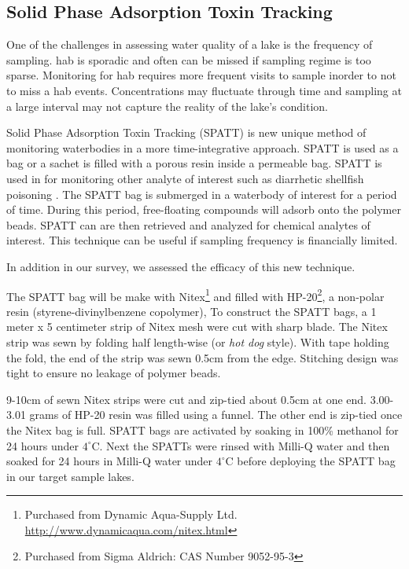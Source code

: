 \clearpage
\newpage

\subsection{Solid Phase Adsorption Toxin Tracking}

One of the challenges in assessing water quality of a lake is the frequency of sampling. \gls{hab} is sporadic and often can be missed if sampling regime is too sparse. Monitoring for \gls{hab} requires more frequent visits to sample inorder to not to miss a  \gls{hab} events. Concentrations may fluctuate through time and sampling at a large interval may not capture the reality of the lake's condition. 

Solid Phase Adsorption Toxin Tracking (SPATT) is new unique method of monitoring waterbodies in a more time-integrative approach. SPATT is used as a bag or a sachet is filled with a porous resin inside a permeable bag.
SPATT is used in for monitoring other analyte of interest such as diarrhetic shellfish poisoning \cite{mackenzie_solid_2004}. %
The SPATT bag  is submerged in a waterbody of interest for a period of time. During this period, free-floating compounds will adsorb onto the polymer beads.  SPATT can are then retrieved and analyzed for chemical analytes of interest. This technique can be useful if sampling frequency is financially limited.

In addition in our survey, we assessed the efficacy of this new technique. 


The SPATT bag will be make with Nitex\footnote{Purchased from Dynamic Aqua-Supply Ltd.  \url{http://www.dynamicaqua.com/nitex.html}} and filled with HP-20\footnote{Purchased from Sigma Aldrich: CAS Number 9052-95-3}, a non-polar resin (styrene-divinylbenzene copolymer),
To construct the SPATT bags, a 1 meter x 5 centimeter strip of Nitex mesh were cut with sharp blade. The Nitex strip was sewn by folding half length-wise (or \emph{hot dog} style). With tape holding the fold, the end of the strip was sewn 0.5cm from the edge. Stitching design was tight to ensure no leakage of polymer beads.

9-10cm of sewn Nitex strips were cut and zip-tied about 0.5cm at one end. 3.00-3.01 grams of HP-20 resin was filled using a funnel. The other end is zip-tied once the Nitex bag is full. SPATT bags are activated by soaking in 100\% methanol for 24 hours under $4^\circ$C. Next the SPATTs were rinsed with Milli-Q water and then soaked for 24 hours in Milli-Q water under $4^\circ$C before deploying the SPATT bag in our target sample lakes.

